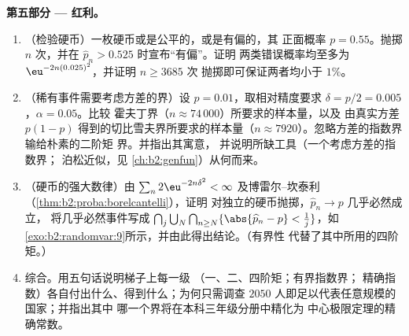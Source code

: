 \begin{problem}
\medskip
\noindent\textbf{第五部分 --- 红利。}
\begin{enumerate}[resume]
  \item （检验硬币）一枚硬币或是公平的，或是有偏的，其
        正面概率 $p = 0.55$。抛掷 $n$ 次，并在
        $\widehat p_n > 0.525$ 时宣布“有偏”。证明
        两类错误概率均至多为
        $\eu^{-2n(0.025)^2}$，并证明 $n \geq 3685$ 次
        抛掷即可保证两者均小于 $1\%$。
  \item （稀有事件需要考虑方差的界）设 $p =
        0.01$，取相对精度要求 $\delta =
        p/2 = 0.005$，$\alpha = 0.05$。比较
        霍夫丁界（$n \approx 74\,000$）所要求的样本量，以及
        由真实方差 $p(1-p)$ 得到的切比雪夫界所要求的样本量（$n
        \approx 7920$）。忽略方差的指数界输给朴素的二阶矩
        界。并指出其寓意，
        并说明所缺工具（一个考虑方差的指数界；
        泊松近似，见
        \cref{ch:b2:genfun}）从何而来。
  \item （硬币的强大数律）由 $\sum_n
        2\eu^{-2n\delta^2} < \infty$ 及博雷尔–坎泰利
        （\cref{thm:b2:proba:borelcantelli}），证明
        对独立的硬币抛掷，$\widehat p_n \to p$ 几乎必然成立，
        将几乎必然事件写成
        $\bigcap_j\bigcup_N\bigcap_{n\geq N}
        \{\abs{\widehat p_n - p} < \tfrac1j\}$，如
        \cref{exo:b2:randomvar:9}所示，并由此得出结论。（有界性
        代替了其中所用的四阶矩。）
  \item 综合。用五句话说明梯子上每一级
        （一、二、四阶矩；有界指数界；
        精确指数）各自付出什么、得到什么；为何只需调查 $2050$
        人即足以代表任意规模的国家；并指出其中
        哪一个界将在本科三年级分册中精化为
        中心极限定理的精确常数。
\end{enumerate}
\end{problem}
